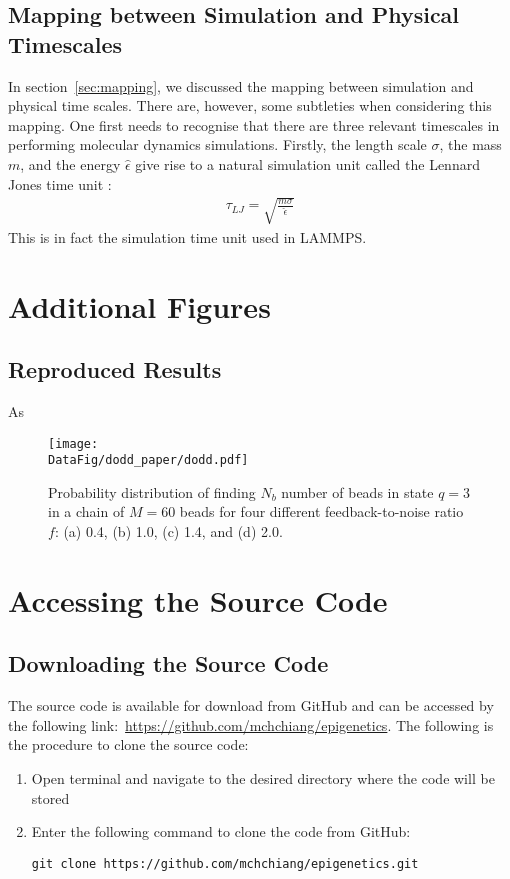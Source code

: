 \documentclass[12pt]{article}
\newcommand*{\DataFig}{/Users/MichaelChiang/Desktop/epigenetics_data/}
\begin{document}
\subsection{Mapping between Simulation and Physical Timescales}
\label{app:timescale}
In section~\ref{sec:mapping}, we discussed the mapping between simulation and physical time scales. There are, however, some subtleties when considering this mapping. One first needs to recognise that there are three relevant timescales in performing molecular dynamics simulations. Firstly, the length scale $\sigma$, the mass $m$, and the energy $\hat{\epsilon}$ give rise to a natural simulation unit called the Lennard Jones time unit :
\begin{eqnarray}
\tau_{LJ} = \sqrt{\frac{m\sigma}{\hat{\epsilon}}}
\end{eqnarray}
This is in fact the simulation time unit used in LAMMPS.

\section{Additional Figures}
\subsection{Reproduced Results}
As 
\label{app:doddresult}
\begin{figure}[h]
\centering
\texttt{[image: \\DataFig/dodd\_paper/dodd.pdf]}
\caption{Probability distribution of finding $N_b$ number of beads in state $q = 3$ in a chain of $M = 60$ beads for four different feedback-to-noise ratio $f$: (a) 0.4, (b) 1.0, (c) 1.4, and (d) 2.0.}
\label{fig:dodd}
\end{figure}
\FloatBarrier

\section{Accessing the Source Code}
\label{app:code}
\subsection{Downloading the Source Code}
The source code is available for download from GitHub and can be accessed by the following link:~\url{https://github.com/mchchiang/epigenetics}. The following is the procedure to clone the source code:
\begin{enumerate}
\item Open terminal and navigate to the desired directory where the code will be stored
\item Enter the following command to clone the code from GitHub:
\begin{lstlisting}
git clone https://github.com/mchchiang/epigenetics.git
\end{lstlisting}
\end{enumerate}
\end{document}
